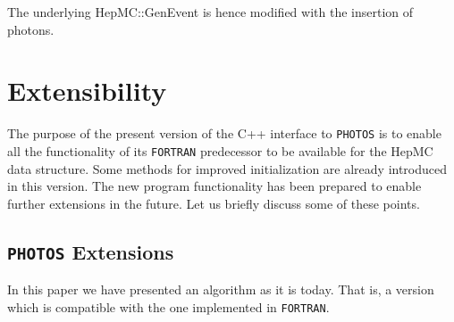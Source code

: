 \documentclass[]{Photos_interface_design}
\begin{document}
The underlying HepMC::GenEvent is hence modified with the  insertion of photons.

\section{Extensibility}
\label{sec:extensibility}
 The purpose of the present version of the C++ interface to {\tt PHOTOS} is to enable 
all the functionality of its {\tt FORTRAN} predecessor to be available for the HepMC data
structure. Some methods for improved initialization are already introduced in this version. The new program 
functionality has been prepared to enable further extensions in the future. 
Let us briefly discuss some of these points.

\subsection{{\tt PHOTOS} Extensions}
In this paper we have presented an algorithm as it is today. 
That is, a version which is compatible with the one implemented in {\tt FORTRAN}.
\end{document}
